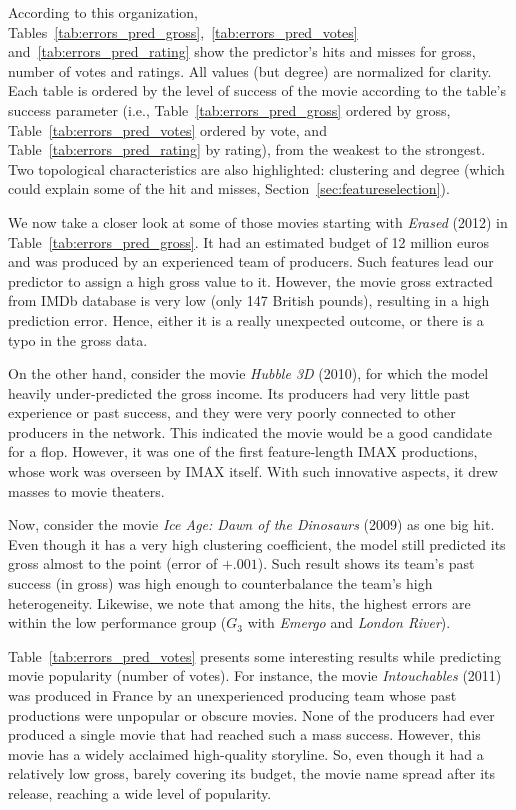 According to this organization,
Tables~\ref{tab:errors_pred_gross},~\ref{tab:errors_pred_votes}
and~\ref{tab:errors_pred_rating} show the predictor's hits and misses for
gross, number of votes and ratings. All values (but degree) are normalized for
clarity. Each table is ordered by the level of success of the movie according
to the table's success parameter (i.e., Table~\ref{tab:errors_pred_gross}
ordered by gross, Table~\ref{tab:errors_pred_votes} ordered by vote, and
Table~\ref{tab:errors_pred_rating} by rating), from the weakest to the
strongest. Two topological characteristics are also highlighted: clustering and degree
(which could explain some of the hit and misses, Section~\ref{sec:featureselection}).

We now take a closer look at some of those movies starting with \textit{Erased}
(2012) in Table~\ref{tab:errors_pred_gross}.  It had an estimated budget of 12
million euros and was produced by an experienced team of producers. Such
features lead our predictor to assign a high gross value to it.  However, the
movie gross extracted from IMDb database is very low (only 147 British pounds),
resulting in a high prediction error. Hence, either it is a really unexpected
outcome, or there is a typo in the gross data.

On the other hand, consider the movie \textit{Hubble 3D}
(2010), for which the model heavily under-predicted the gross income. Its
producers had very little past experience or past success, and they were very
poorly connected to other producers in the network. This indicated the movie would
be a good candidate for a flop. However, it was one of the first feature-length IMAX
productions, whose work was overseen by IMAX itself. With such innovative
aspects, it drew masses to movie theaters.





Now, consider the movie \textit{Ice Age: Dawn of the Dinosaurs} (2009) as one
big hit. Even though it has a very high clustering coefficient, the model still
predicted its gross almost to the point (error of $+.001$). Such result shows
its team's past success (in gross) was high enough to counterbalance the team's
high heterogeneity. Likewise, we note that among the hits, the highest errors
are within the low performance group ($G_3$ with \textit{Emergo} and
\textit{London River}).

Table~\ref{tab:errors_pred_votes} presents some interesting results while
predicting movie popularity (number of votes). For instance, the movie
\textit{Intouchables} (2011) was produced in France by an unexperienced
producing team whose past productions were unpopular or obscure movies. None of
the producers had ever produced a single movie that had reached such a mass
success. However, this movie has a widely acclaimed high-quality storyline. So,
even though it had a relatively low gross, barely covering its budget, the
movie name spread after its release, reaching a wide level of popularity.


